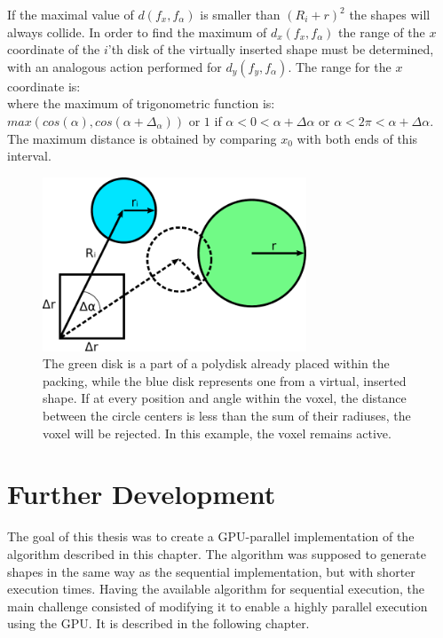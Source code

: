 \documentclass[12pt, oneside]{report}
\begin{document}
If the maximal value of $d(f_x,f_{\alpha})$ is smaller than $(R_i + r)^2$ the shapes will always collide. \newline
In order to find the maximum of $d_x(f_x,f_{\alpha})$ the range of the $x$ coordinate of the $i$'th disk of the virtually inserted shape must be determined, with an analogous action performed for $d_y(f_y,f_{\alpha})$. The range for the $x$ coordinate is:
\begin{equation*}
[x + R_i \cdot \min_{f_{\alpha} \in [0,1)} cos(\alpha_i + f_{\alpha} \cdot \Delta \alpha), x + \Delta r + R_i \cdot \max_{f_{\alpha} \in [0,1)} cos(\alpha_i + f_{\alpha} \cdot \Delta \alpha)]
\end{equation*}
where the maximum of trigonometric function is: $max (cos(\alpha), cos(\alpha + \Delta_{\alpha})) $ or
$1$ if $ \alpha<0<\alpha + \Delta \alpha $ or $ \alpha< 2 \pi <\alpha + \Delta \alpha$.
The maximum distance is obtained by comparing $x_0$ with both ends of this interval. \newline


\begin{figure}[H]
  \centering
	\includegraphics[width=0.7\textwidth,keepaspectratio]{Images/CieslaAlgorithm/drawing.pdf}
	\caption{The green disk is a part of a polydisk already placed within the packing, while the blue disk represents one from a virtual, inserted shape. If at every position and angle within the voxel, the distance between the circle centers is less than the sum of their radiuses, the voxel will be rejected. In this example, the voxel remains active.}
	\label{CieslaAlgorithmDemo}
\end{figure}

\section{Further Development}

The goal of this thesis was to create a GPU-parallel implementation of the algorithm described in this chapter. The algorithm was supposed to generate shapes in the same way as the sequential implementation, but with shorter execution times. \newline
Having the available algorithm for sequential execution, the main challenge consisted of modifying it to enable a highly parallel execution using the GPU. It is described in the following chapter.
\end{document}
